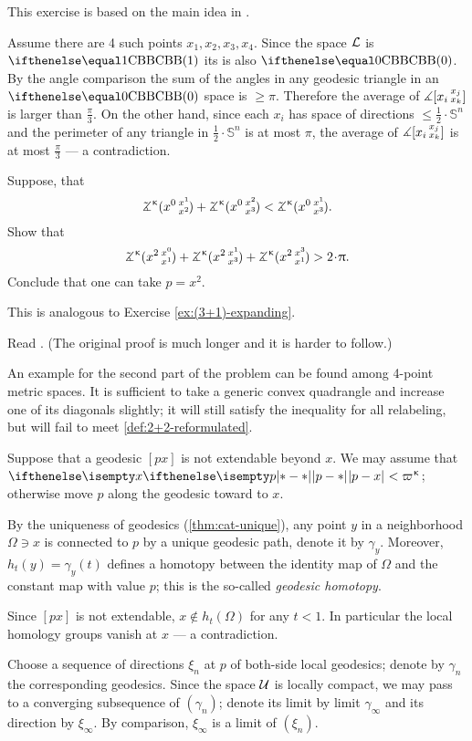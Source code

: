 This exercise is based on the main idea in \cite{hsiang-kleiner}.

\medskip

Assume there are 4 such points $x_1,x_2,x_3,x_4$.
Since the space $\mathcal{L}$ is $\Alex{1}$  its is also $\Alex{0}$. By the angle comparison the sum of the angles in any geodesic triangle in an $\Alex{0}$ space is $\ge \pi$.
Therefore the average of $\measuredangle[x_i\,{}^{x_j}_{x_k}]$ is  larger than $\tfrac\pi3$.
On the other hand, since each $x_i$ has space of directions $\le\tfrac12\cdot\mathbb{S}^n$ and the perimeter of any triangle in $\tfrac12\cdot\mathbb{S}^n$ is at most $\pi$, the average of $\measuredangle[x_i\,{}^{x_j}_{x_k}]$ is at most $\tfrac\pi3$ --- a contradiction.


Suppose, that 
\[\angk\kappa {x^0}{x^1}{x^2}+\angk\kappa {x^0}{x^2}{x^3}<\angk\kappa {x^0}{x^1}{x^3}.\]
Show that
\[\angk\kappa {x^2}{x^0}{x^1}+\angk\kappa {x^2}{x^1}{x^3}+\angk\kappa {x^2}{x^3}{x^1}>2\cdot\pi.\]
Conclude that one can take $p=x^2$.

This is analogous to Exercise \ref{ex:(3+1)-expanding}.

 Read \cite{sato}. (The original proof \cite{berg-nikolaev} is much longer and it is harder to follow.)

An example for the second part of the problem can be found among 4-point metric spaces.
It is sufficient to take a generic convex quadrangle and increase one of its diagonals slightly;
it will still satisfy the inequality for all relabeling, but will fail to meet \ref{def:2+2-reformulated}.

Suppose that a geodesic $[px]$ is not extendable beyond $x$.
We may assume that $\dist{p}{x}{}<\varpi\kappa$;
otherwise move $p$ along the geodesic toward to $x$.

By the uniqueness of geodesics (\ref{thm:cat-unique}), any point $y$ in a neighborhood $\Omega\ni x$ is connected to $p$ by a unique geodesic path, denote it by $\gamma_y$.
Moreover, $h_t(y)=\gamma_y(t)$ defines a homotopy between the identity map of $\Omega$ and the constant map with value $p$;
this is the  so-called \emph{geodesic homotopy}.

Since $[px]$ is not extendable, $x\notin h_t(\Omega)$ for any $t<1$.
In particular the local homology groups vanish at $x$ --- a contradiction.

 Choose a sequence of 
directions $\xi_n$ at $p$
of both-side local geodesics; denote by $\gamma_n$ the corresponding geodesics.
Since the space $\mathcal{U}$ is locally compact, we may pass to a converging subsequence of $(\gamma_n)$; denote its limit by limit $\gamma_\infty$ and its direction by $\xi_\infty$.
By comparison, $\xi_\infty$ is a limit of $(\xi_n)$.

